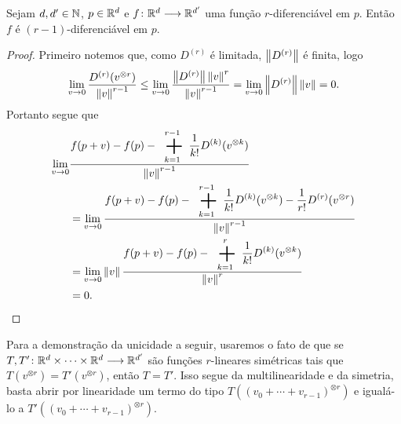 \begin{proposition}
Sejam $d,d' \in \mathbb{N}$, $p \in \mathbb{R}^d$ e ${f}\colon {\mathbb{R}^d} \longrightarrow {\mathbb{R}^{d'}}$ uma função $r$-diferenciável em $p$. Então $f$ é $(r-1)$-diferenciável em $p$.
\end{proposition}
\begin{proof}
Primeiro notemos que, como $D^{(r)}$ é limitada, $\left\Vert{D^{(r)}}\right\Vert$ é finita, logo
	\begin{equation*}
	\lim_{v \rightarrow 0} \frac{D^{(r)}(v^{\otimes r})}{\left\Vert{v}\right\Vert^{r-1}} \leq \lim_{v \rightarrow 0} \frac{\left\Vert{D^{(r)}}\right\Vert \left\Vert{v}\right\Vert^r}{\left\Vert{v}\right\Vert^{r-1}} = \lim_{v \rightarrow 0} \left\Vert{D^{(r)}}\right\Vert\left\Vert{v}\right\Vert = 0.
	\end{equation*}
Portanto segue que
	\begin{align*}
	\lim_{v \conv 0} &\frac{\displaystyle f(p+v)-f(p)- \sum_{k=1}^{r-1} \frac{1}{k!}D^{(k)}(v^{\otimes k})}{\nor{v}^{r-1}} \\
		&= \lim_{v \conv 0} \frac{\displaystyle f(p+v)-f(p)- \sum_{k=1}^{r-1} \frac{1}{k!}D^{(k)}(v^{\otimes k})-\frac{1}{r!}D^{(r)}(v^{\otimes r})}{\nor{v}^{r-1}}\\
		&= \lim_{v \conv 0} \nor{v}\frac{\displaystyle f(p+v)-f(p)- \sum_{k=1}^r \frac{1}{k!}D^{(k)}(v^{\otimes k})}{\nor{v}^r} \\
		&= 0.
	\end{align*}
\end{proof}

Para a demonstração da unicidade a seguir, usaremos o fato de que se ${T,T'}\colon {\mathbb{R}^d \times \cdots \times \mathbb{R}^d} \longrightarrow {\mathbb{R}^{d'}}$ são funções $r$-lineares simétricas tais que $T(v^{\otimes r}) = T'(v^{\otimes r})$, então $T=T'$. Isso segue da multilinearidade e da simetria, basta abrir por linearidade um termo do tipo $T((v_0+\cdots+v_{r-1})^{\otimes r})$ e igualá-lo a $T'((v_0+\cdots+v_{r-1})^{\otimes r})$.

